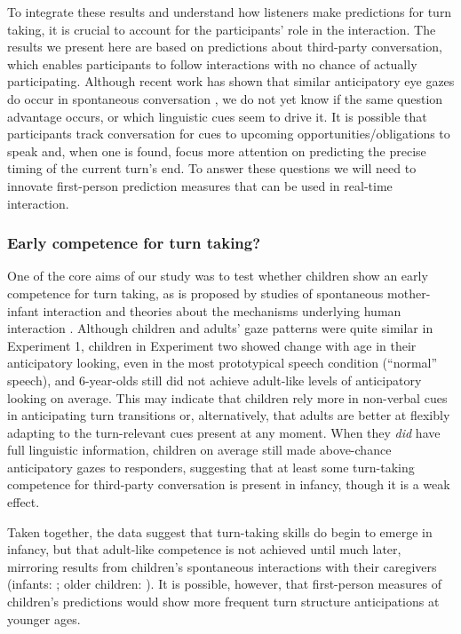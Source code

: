 \documentclass[authoryear, 12pt]{elsarticle}
\begin{document}
To integrate these results and understand how listeners make predictions for turn taking, it is crucial to account for the participants' role in the interaction. The results we present here are based on predictions about third-party conversation, which enables participants to follow interactions with no chance of actually participating. Although recent work has shown that similar anticipatory eye gazes do occur in spontaneous conversation \citep{holler2015}, we do not yet know if the same question advantage occurs, or which linguistic cues seem to drive it. It is possible that participants track conversation for cues to upcoming opportunities/obligations to speak and, when one is found, focus more attention on predicting the precise timing of the current turn's end. To answer these questions we will need to innovate first-person prediction measures that can be used in real-time interaction.

\subsubsection{Early competence for turn taking?}

One of the core aims of our study was to test whether children show an early competence for turn taking, as is proposed by studies of spontaneous mother-infant interaction and theories about the mechanisms underlying human interaction \citep{hilbrink2015, levinson2006}. Although children and adults' gaze patterns were quite similar in Experiment 1, children in Experiment two showed change with age in their anticipatory looking, even in the most prototypical speech condition (``normal'' speech), and 6-year-olds still did not achieve adult-like levels of anticipatory looking on average. This may indicate that children rely more in non-verbal cues in anticipating turn transitions or, alternatively, that adults are better at flexibly adapting to the turn-relevant cues present at any moment. When they \textit{did} have full linguistic information, children on average still made above-chance anticipatory gazes to responders, suggesting that at least some turn-taking competence for third-party conversation is present in infancy, though it is a weak effect.

Taken together, the data suggest that turn-taking skills do begin to emerge in infancy, but that adult-like competence is not achieved until much later, mirroring results from children's spontaneous interactions with their caregivers (infants: \citealp{hilbrink2015, jaffe2001, snow1977}; older children: \citealp{casillas2016, garvey1984, ervin-tripp1979}). It is possible, however, that first-person measures of children's predictions would show more frequent turn structure anticipations at younger ages.
\end{document}

